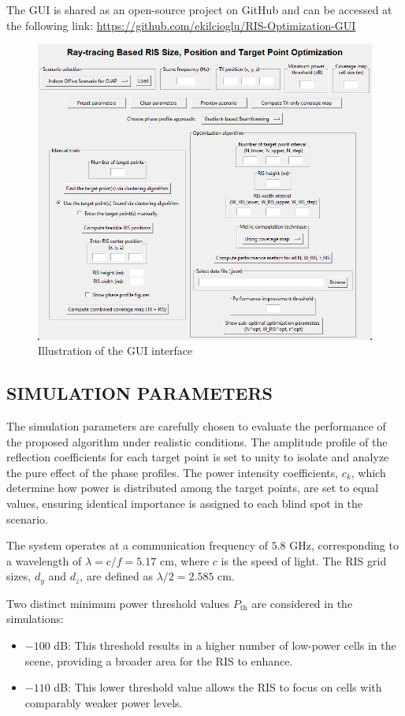 \documentclass{IEEEoj}
\begin{document}
The GUI is shared as an open-source project on GitHub and can be accessed at the following link:  
\url{https://github.com/ekilcioglu/RIS-Optimization-GUI}

\begin{figure}
	\centering \includegraphics[width=\linewidth]{Sim_Results/GUI.png}
	\caption{Illustration of the GUI interface}
	\label{GUI}
\end{figure}

\subsection{SIMULATION PARAMETERS}
The simulation parameters are carefully chosen to evaluate the performance of the proposed algorithm under realistic conditions. The amplitude profile of the reflection coefficients for each target point is set to unity to isolate and analyze the pure effect of the phase profiles. The power intensity coefficients, $c_k$, which determine how power is distributed among the target points, are set to equal values, ensuring identical importance is assigned to each blind spot in the scenario.

The system operates at a communication frequency of $5.8$ GHz, corresponding to a wavelength of $\lambda = c/f = 5.17$ cm, where $c$ is the speed of light. The RIS grid sizes, $d_y$ and $d_z$, are defined as $\lambda / 2 = 2.585$ cm.

Two distinct minimum power threshold values $P_{\text{th}}$ are considered in the simulations:  
\begin{itemize}
	\item $-100$ dB: This threshold results in a higher number of low-power cells in the scene, providing a broader area for the RIS to enhance.
	\item $-110$ dB: This lower threshold value allows the RIS to focus on cells with comparably weaker power levels.
\end{itemize}
\end{document}
